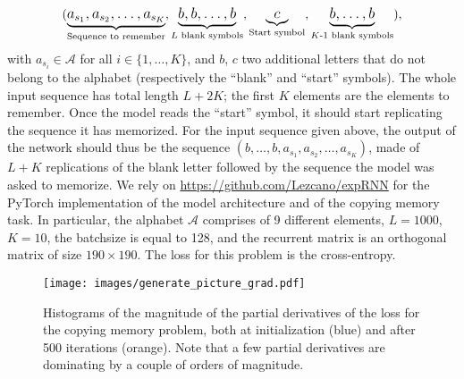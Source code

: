 \documentclass{article}
\newcommand{\emcomm}[1]{{\color{orange} #1}}
\begin{document}
\[{\large (\underbrace{a_{s_1}, a_{s_2}, \dots, a_{s_K}}_{\text{Sequence to remember}}, \underbrace{b, b, \dots, b}_{\text{$L$ blank symbols}}, \underbrace{c}_{\text{Start symbol}}, \underbrace{b, \dots, b}_{\text{$K$-1 blank symbols}}),}\]
with $a_{s_i} \in \mathcal{A}$ for all $i \in \{1, \dots, K\}$, and $b$, $c$ two additional letters that do not belong to the alphabet (respectively the ``blank'' and ``start'' symbols). The whole input sequence has total length $L+2K$; the first $K$ elements are the elements to remember. Once the model reads the ``start'' symbol, it should start replicating the sequence it has memorized. For the input sequence given above, the output of the network should thus be the sequence $(b, \dots, b, a_{s_1}, a_{s_2}, \dots, a_{s_K})$, made of $L+K$ replications of the blank letter followed by the sequence the model was asked to memorize. We rely on \url{https://github.com/Lezcano/expRNN} for the PyTorch implementation of the model architecture and of the copying memory task. In particular, the alphabet $\mathcal{A}$ comprises of 9 different elements, $L = 1000$, $K = 10$, the batchsize is equal to 128, and the recurrent matrix is an orthogonal matrix of size $190 \times 190$. The loss for this problem is the cross-entropy. 



\begin{figure}[t!]
    \centering
    \texttt{[image: images/generate\_picture\_grad.pdf]}
    \caption{Histograms of the magnitude of the partial derivatives of the loss for the copying memory problem, both at initialization (blue) and after 500 iterations (orange). Note that a few partial derivatives are dominating by a couple of orders of magnitude. }
    \label{fig:partialCopyingGradient}
\end{figure}
\end{document}
